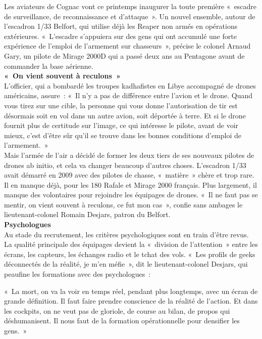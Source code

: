 \documentclass[8pt]{article}
\begin{document}
Les aviateurs de Cognac vont ce printemps inaugurer la toute première «~escadre de surveillance, de reconnaissance et d’attaque~». Un nouvel ensemble, autour de l’escadron 1/33 Belfort, qui utilise déjà les Reaper non armés en opérations extérieures. «~L’escadre s’appuiera sur des gens qui ont accumulé une forte expérience de l’emploi de l’armement sur chasseurs~», précise le colonel Arnaud Gary, un pilote de Mirage 2000D qui a passé deux ans au Pentagone avant de commander la base aérienne.\\

\textbf{«~On vient souvent à reculons~»}\\

L’officier, qui a bombardé les troupes kadhafistes en Libye accompagné de drones américains, assure~: «~Il n’y a pas de différence entre l’avion et le drone. Quand vous tirez sur une cible, la personne qui vous donne l’autorisation de tir est désormais soit en vol dans un autre avion, soit déportée à terre. Et si le drone fournit plus de certitude sur l’image, ce qui intéresse le pilote, avant de voir mieux, c’est d’être sûr qu’il se trouve dans les bonnes conditions d’emploi de l’armement.~»\\

Mais l’armée de l’air a décidé de former les deux tiers de ses nouveaux pilotes de drones ab initio, et cela va changer beaucoup d’autres choses. L’escadron 1/33 avait démarré en 2009 avec des pilotes de chasse, «~matière~» chère et trop rare. Il en manque déjà, pour les 180 Rafale et Mirage 2000 français. Plus largement, il manque des volontaires pour rejoindre les équipages de drones. «~Il ne faut pas se mentir, on vient souvent à reculons, ce fut mon cas~», confie sans ambages le lieutenant-colonel Romain Desjars, patron du Belfort.\\

\textbf{Psychologues}\\

Au stade du recrutement, les critères psychologiques sont en train d’être revus. La qualité principale des équipages devient la «~division de l’attention~» entre les écrans, les capteurs, les échanges radio et le tchat des vols. «~Les profils de geeks déconnectés de la réalité, je m’en méfie~», dit le lieutenant-colonel Desjars, qui peaufine les formations avec des psychologues~:

«~La mort, on va la voir en temps réel, pendant plus longtemps, avec un écran de grande définition. Il faut faire prendre conscience de la réalité de l’action. Et dans les cockpits, on ne veut pas de gloriole, de course au bilan, de propos qui déshumanisent. Il nous faut de la formation opérationnelle pour densifier les gens.~»\\
\end{document}
